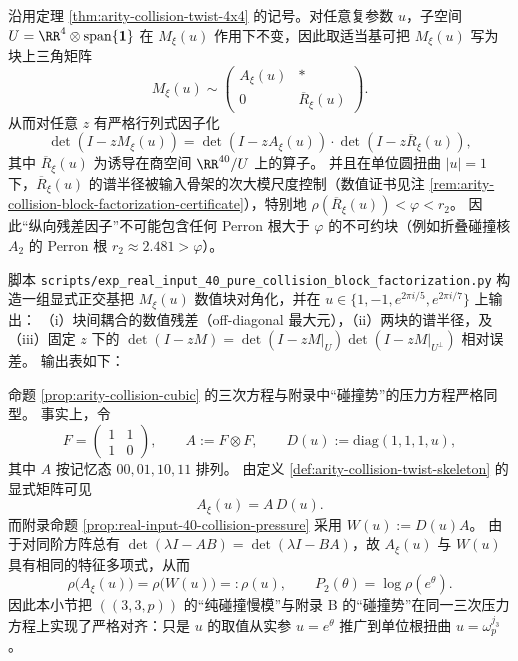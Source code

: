 \begin{remark}[块上三角分解与行列式因子化]\label{cor:arity-collision-det-factorization}
沿用定理 \ref{thm:arity-collision-twist-4x4} 的记号。对任意复参数 \(u\)，子空间
\(
U=\RR^{4}\otimes \mathrm{span}\{\mathbf{1}\}
\)
在 \(M_\xi(u)\) 作用下不变，因此取适当基可把 \(M_\xi(u)\) 写为块上三角矩阵
\[
M_\xi(u)\sim
\begin{pmatrix}
A_\xi(u) & *\\
0 & \overline R_\xi(u)
\end{pmatrix}.
\]
从而对任意 \(z\) 有严格行列式因子化
$$
\det(I-zM_\xi(u))=\det(I-zA_\xi(u))\cdot \det(I-z\overline R_\xi(u)),
$$
其中 \(\overline R_\xi(u)\) 为诱导在商空间 \(\RR^{40}/U\) 上的算子。
并且在单位圆扭曲 \(|u|=1\) 下，\(\overline R_\xi(u)\) 的谱半径被输入骨架的次大模尺度控制（数值证书见注 \ref{rem:arity-collision-block-factorization-certificate}），特别地 \(\rho(\overline R_\xi(u))<\varphi<r_2\)。
因此“纵向残差因子”不可能包含任何 Perron 根大于 \(\varphi\) 的不可约块（例如折叠碰撞核 \(A_2\) 的 Perron 根 \(r_2\approx 2.481>\varphi\)）。
\end{remark}

\begin{remark}\label{rem:arity-collision-block-factorization-certificate}
脚本 \texttt{scripts/exp\_real\_input\_40\_pure\_collision\_block\_factorization.py} 构造一组显式正交基把 \(M_\xi(u)\) 数值块对角化，并在 \(u\in\{1,-1,e^{2\pi i/5},e^{2\pi i/7}\}\) 上输出：
（i）块间耦合的数值残差（off-diagonal 最大元），（ii）两块的谱半径，及（iii）固定 \(z\) 下的 \(\det(I-zM)=\det(I-zM|_U)\det(I-zM|_{U^\perp})\) 相对误差。
输出表如下：

\end{remark}

\begin{remark}\label{rem:arity-collision-cubic-align}
命题 \ref{prop:arity-collision-cubic} 的三次方程与附录中“碰撞势”的压力方程严格同型。
事实上，令
\[
F=\begin{pmatrix}1&1\\[2pt]1&0\end{pmatrix},\qquad
A:=F\otimes F,\qquad
D(u):=\mathrm{diag}(1,1,1,u),
\]
其中 \(A\) 按记忆态 \(00,01,10,11\) 排列。
由定义 \ref{def:arity-collision-twist-skeleton} 的显式矩阵可见
\[
A_\xi(u)=A\,D(u).
\]
而附录命题 \ref{prop:real-input-40-collision-pressure} 采用 \(W(u):=D(u)A\)。
由于对同阶方阵总有 \(\det(\lambda I-AB)=\det(\lambda I-BA)\)，故 \(A_\xi(u)\) 与 \(W(u)\) 具有相同的特征多项式，从而
\[
\rho\bigl(A_\xi(u)\bigr)=\rho\bigl(W(u)\bigr)=:\rho(u),
\qquad
P_2(\theta)=\log\rho(e^\theta).
\]
因此本小节把 \(((3,3,p))\) 的“纯碰撞慢模”与附录 B 的“碰撞势”在同一三次压力方程上实现了严格对齐：只是 \(u\) 的取值从实参 \(u=e^\theta\) 推广到单位根扭曲 \(u=\omega_p^{j_3}\)。
\end{remark}

